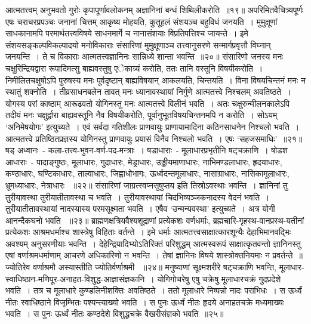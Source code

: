 \indent  आत्मतत्त्वम् अनुभवतो गुरोः कृपापूर्णावलोकनम्  अज्ञानिनां बन्धं शिथिलीकरोति~॥१९॥
\indent  अपरिमितवैचित्र्यपूर्णः एषः चराचरप्रपञ्चः जनानां चित्तम् आकृष्य मोहयति, कुतूहलं संशयञ्च बहुविधं जनयति~। मुमुक्षूणां साधकानामपि परमार्थतत्त्वविषये साधनमार्गे च नानासंशयाः विप्रतिपत्तिश्च जायन्ते~। इमे संशयसङ्कल्पविकल्पादयो मनोविकाराः संसारिणां मुमुक्षूणाञ्च तत्त्वानुसरणे सन्मार्गप्रवृत्तौ विघ्नान् जनयन्ति~। ते च विकाराः आत्मतत्त्वज्ञानिनः सान्निध्ये शान्ता भवन्ति~॥२०॥
\indent  संसारिणो जनस्य मनः चक्षुरिन्द्रियद्वारा  रूपादिमत्सु बाह्यवस्तुषु एेकाग्र्यं करोति, ततः तानि वस्तूनि विषयीकरोति~। निमीलितचक्षुषोऽपि पुरुषस्य मनः पूर्वदृष्टान् बाह्यविषयान् आकलयति, चिन्तयति~। विना विषयचिन्तनं मनः न स्थातुं शक्नोति~। तीव्रसाधनबलेन तावत् मनः ध्यानावस्थायां निर्गुणे आत्मतत्त्वे निश्चलम् अवतिष्ठते~। योगस्य परां काष्ठाम् आरूढवतो योगिनस्तु मनः आत्मतत्त्वे विलीनं भवति~। अतः  चक्षुरुन्मीलनकालेऽपि तदीयं मनः चक्षुर्द्वारा बाह्यवस्तूनि नैव विषयीकरोति, पूर्वानुभूतविषयचिन्तनमपि न करोति~। सोऽयम् ‘अनिमेषयोगः’ इत्युच्यते~। एवं सर्वदा गतिशीलः प्राणवायुः प्राणायामादिना कठिनसाधनेन निश्चलो भवति~। आत्मतत्त्वे प्रतिष्ठितप्रज्ञस्य योगिनस्तु प्राणवायुः प्रयासं विनैव निश्चलो भवति~। एषः ‘सहजसमाधिः'~॥२१॥
\indent षड् अध्वानः~- कला-तत्त्व-भुवन-वर्ण-पद-मन्त्राः~। षडाधाराः~- मूलाधारप्रभृतीनि षट्‌चक्राणि~। षोडश आधाराः~- पादाङ्गुष्ठः, मूलाधारः, गुदाधारः, मेड्राधारः, उड्डीयमाणाधारः, नाभिमण्डलाधारः, हृदयाधारः, कण्ठाधारः, घण्टिकाधारः, ताल्वाधारः, जिह्वाधोभागः, ऊर्ध्वदन्तमूलाधारः, नासाग्राधारः, नासिकामूलाधारः, भ्रूमध्याधारः, नेत्राधारः \footB\ ॥२२॥
\indent  संसारिणां जाग्रत्स्वप्नसुषुप्तय इति तिस्रोऽवस्थाः भवन्ति~। ज्ञानिनां तु तुरीयावस्था तुरीयातीतावस्था च भवति~। तुरीयावस्थायां चिदभिव्यञ्जकनादस्य वेदनं भवति~। तुरीयातीतावस्थायां नादस्यास्य परमसूक्ष्मता भवति~। एषैव ‘उन्मन्यवस्था’ इत्युच्यते~। अत्र योगी आनन्दैकघनो भवति \footB\ ॥२३॥
\indent  ब्राह्मणक्षत्रियवैश्यशूद्राणां प्रत्येकशः वर्णधर्माः, ब्रह्मचारि-गृहस्थ-वानप्रस्थ-यतीनां प्रत्येकशः आश्रमधर्माश्च शास्त्रेषु विहिताः वर्तन्ते~। इमे धर्माः आत्मतत्त्वसाक्षात्कारशून्यैः देहाभिमानवद्भिः अवश्यम् अनुसरणीयाः भवन्ति~। देहेन्द्रियादिभ्योऽतिरिक्तं परिशुद्धम् आत्मस्वरूपं साक्षात्कृतवन्तो ज्ञानिनस्तु एषां वर्णाश्रमधर्माणाम् आचरणे अधिकारिणो न भवन्ति~। तेषां ज्ञानिनः विषये शास्त्रोक्तनियमाः न प्रवर्तन्ते~॥ ज्योतिरेव वर्णाश्रमौ अस्यास्तीति ज्योतिर्वर्णाश्रमी \footB\ ॥२४॥ 
\indent  मनुष्याणां सूक्ष्मशरीरे षट्‌चक्राणि भवन्ति, मूलाधार-स्वाधिष्ठान-मणिपूर-अनाहत-विशुद्ध-आज्ञासंज्ञकानि~। योगिगोचरेषु एषु चक्रेषु मूलाधारचक्रं गुदप्रदेशे भवति~। तत्र च मूलाधारे कुण्डलिनीशक्तिः अवतिष्ठते~। ततो मूलाधारे निष्पन्नो नादः पराभिधः~। स ऊर्ध्वं नीतः स्वाधिष्ठाने विजृम्भितः पश्यन्त्याख्यो भवति~। स पुनः ऊर्ध्वं नीतः हृदये अनाहतचक्रे मध्यमाख्यः भवति~। स पुनः ऊर्ध्वं नीतः कण्ठदेशे विशुद्धचक्रे वैखरीसंज्ञको भवति~॥२५॥

